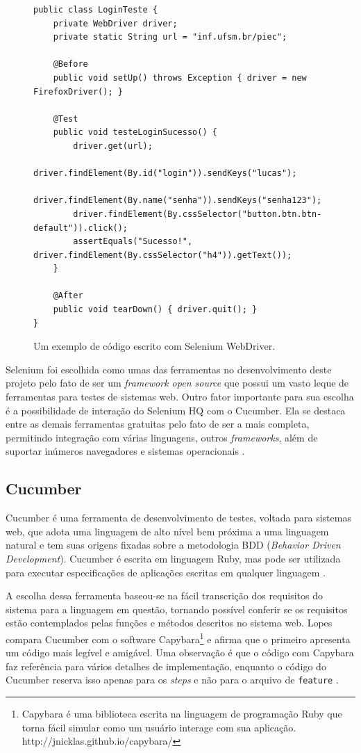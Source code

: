 \documentclass[tg]{mdtufsm}
\begin{document}
\begin{figure}[!htt]
	\begin{lstlisting}
public class LoginTeste {
	private WebDriver driver;
	private static String url = "inf.ufsm.br/piec";
	
	@Before
	public void setUp() throws Exception { driver = new FirefoxDriver(); }
	
	@Test
	public void testeLoginSucesso() {
		driver.get(url);
		driver.findElement(By.id("login")).sendKeys("lucas");
		driver.findElement(By.name("senha")).sendKeys("senha123");
		driver.findElement(By.cssSelector("button.btn.btn-default")).click();
		assertEquals("Sucesso!", driver.findElement(By.cssSelector("h4")).getText());
	}
	
	@After
	public void tearDown() { driver.quit(); }
}
	\end{lstlisting}
	\caption{Um exemplo de código escrito com Selenium WebDriver.}
	\label{code:seleniumWebDriver}
\end{figure}

Selenium foi escolhida como umas das ferramentas no desenvolvimento deste projeto pelo fato de ser um \emph{framework open source} que possui um vasto leque de ferramentas para testes de sistemas web. Outro fator
importante para sua escolha é a possibilidade de interação do Selenium HQ com o Cucumber. Ela se destaca entre as demais ferramentas gratuitas pelo fato de ser a mais completa, permitindo integração com
várias linguagens, outros \emph{frameworks}, além de suportar inúmeros navegadores e sistemas operacionais \cite{pereiraestudoselenium}.

\subsection{Cucumber}
Cucumber é uma ferramenta de desenvolvimento de testes, voltada para sistemas web, que adota uma linguagem de alto nível bem próxima a uma linguagem natural e tem suas origens fixadas sobre a metodologia BDD (\emph{Behavior Driven Development}). Cucumber
é escrita em linguagem Ruby, mas pode ser utilizada para executar especificações de aplicações escritas em qualquer linguagem \cite{nunescucumber}.

A escolha dessa ferramenta baseou-se na fácil transcrição dos requisitos do sistema para a linguagem em questão, tornando possível conferir se os requisitos estão contemplados pelas funções e métodos descritos no sistema web.
Lopes \citeyearpar{lopescucumbervalor} compara Cucumber com o software Capybara\footnote{Capybara é uma biblioteca escrita na linguagem de programação Ruby que torna fácil simular como um usuário interage com sua aplicação. http://jnicklas.github.io/capybara/} e afirma que o primeiro apresenta um código mais legível e amigável. Uma observação é que o código com Capybara faz
referência para vários detalhes de implementação, enquanto o código do Cucumber reserva isso apenas para os \emph{steps} e não para o arquivo de \texttt{feature} \cite{lopescucumbervalor}.
\end{document}
